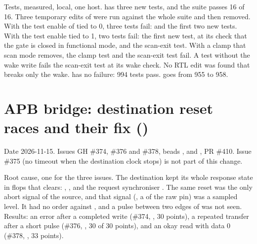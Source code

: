 \begin{record}

Tests, measured, local, one host.  has three new tests, and the suite passes 16 of 16. Three temporary edits of  were run against the whole suite and then removed. With the test enable of  tied to 0, three tests fail:  and the first two new tests. With the test enable tied to 1, two tests fail: the first new test, at its check that the gate is closed in functional mode, and the scan-exit test. With a clamp that scan mode removes, the clamp test and the scan-exit test fail. A test without the wake write fails the scan-exit test at its wake check. No RTL edit was found that breaks only the wake.  has no failure: 994 tests pass.  goes from 955 to 958.

\end{record}

\section{APB bridge: destination reset races and their fix ()}\label{cr:defect:apb-cdc-bridge-reset-race}

\begin{record}

Date 2026-11-15. Issues GH \#374, \#376 and \#378, beads ,  and , PR \#410. Issue \#375 (no timeout when the destination clock stops) is not part of this change.

\end{record}

\begin{record}

Root cause, one for the three issues. The destination kept its whole response state in flops that  clears: , ,  and the request synchroniser . The same reset was the only abort signal of the source, and that signal (, a  of the raw pin) was a sampled level. It had no order against , and a pulse between two edges of  was not seen. Results: an error after a completed write (\#374, , 30 points), a repeated transfer after a short pulse (\#376, , 30 of 30 points), and an okay read with data 0 (\#378, , 33 points).

\end{record}

